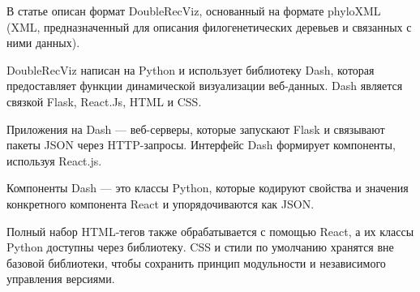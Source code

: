 В статье описан формат DoubleRecViz, основанный на формате phyloXML (XML, предназначенный для описания филогенетических деревьев и связанных с ними данных). 

DoubleRecViz написан на Python и использует библиотеку Dash, которая предоставляет функции динамической визуализации веб-данных.
Dash является связкой Flask, React.Js, HTML и CSS.

Приложения на Dash — веб-серверы, которые запускают Flask и связывают пакеты JSON через HTTP-запросы. Интерфейс Dash формирует компоненты, используя React.js.

Компоненты Dash — это классы Python, которые кодируют свойства и значения конкретного компонента React и упорядочиваются как JSON. 

Полный набор HTML-тегов также обрабатывается с помощью React, а их классы Python доступны через библиотеку. CSS и стили по умолчанию хранятся вне базовой библиотеки, чтобы сохранить принцип модульности и независимого управления версиями.

\noteattributes{}

